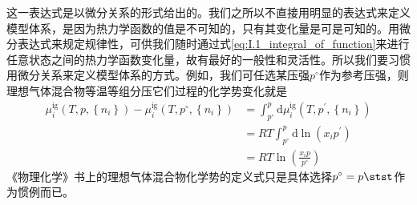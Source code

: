 \documentclass[main.tex]{subfiles}
\begin{document}
这一表达式是以微分关系的形式给出的。我们之所以不直接用明显的表达式来定义模型体系，是因为热力学函数的值是不可知的，只有其变化量是可是可知的。用微分表达式来规定规律性，可供我们随时通过式\eqref{eq:I.1_integral_of_function}来进行任意状态之间的热力学函数变化量，故有最好的一般性和灵活性。所以我们要习惯用微分关系来定义模型体系的方式。例如，我们可任选某压强$p^\circ$作为参考压强，则理想气体混合物等温等组分压它们过程的化学势变化就是
\begin{align*}
    \mu_i^\text{ig}\left(T,p,\left\{n_i\right\}\right)-\mu_i^\text{ig}\left(T,p^\circ,\left\{n_i\right\}\right) & =\int_{p^\circ}^p\mathrm{d}\mu_i^\text{ig}\left(T,p^\prime,\left\{n_i\right\}\right) \\
                                                                                                                & =RT\int_{p^\circ}^p\mathrm{d}\ln\left(x_ip^\prime\right)                             \\
                                                                                                                & =RT\ln\left(\frac{x_ip}{p^\circ}\right)
\end{align*}
《物理化学》书上的理想气体混合物化学势的定义式只是具体选择$p^\circ=p\stst$作为惯例而已。
\end{document}
